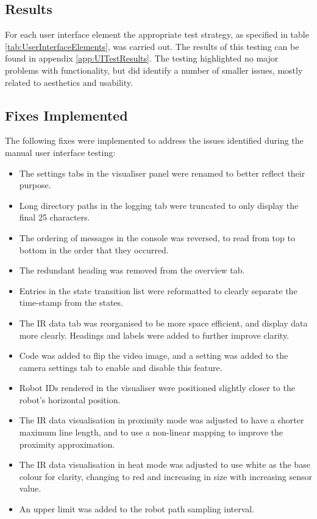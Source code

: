 \subsection{Results}
For each user interface element the appropriate test strategy, as specified in table \ref{tab:UserInterfaceElements}, was carried out. The results of this testing can be found in appendix \ref{app:UITestResults}. The testing highlighted no major problems with functionality, but did identify a number of smaller issues, mostly related to aesthetics and usability.

\subsection{Fixes Implemented}
The following fixes were implemented to address the issues identified during the manual user interface testing:

\begin{itemize}
 \item The settings tabs in the visualiser panel were renamed to better reflect their purpose.
 \item Long directory paths in the logging tab were truncated to only display the final 25 characters.
 \item The ordering of messages in the console was reversed, to read from top to bottom in the order that they occurred.
 \item The redundant heading was removed from the overview tab.
 \item Entries in the state transition list were reformatted to clearly separate the time-stamp from the states.
 \item The IR data tab was reorganised to be more space efficient, and display data more clearly. Headings and labels were added to further improve clarity.
 \item Code was added to flip the video image, and a setting was added to the camera settings tab to enable and disable this feature.
 \item Robot IDs rendered in the visualiser were positioned slightly closer to the robot's horizontal position.
 \item The IR data visualisation in proximity mode was adjusted to have a shorter maximum line length, and to use a non-linear mapping to improve the proximity approximation.
 \item The IR data visualisation in heat mode was adjusted to use white as the base colour for clarity, changing to red and increasing in size with increasing sensor value.
 \item An upper limit was added to the robot path sampling interval.
\end{itemize}

